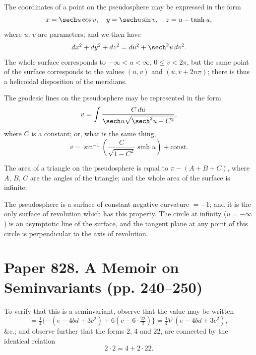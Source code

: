 \documentclass[11pt,a4paper]{book}
\begin{document}
\newpage
\begin{art}
The coordinates of a point on the pseudosphere may be expressed in the form
\[
x = \sech u \cos v, \quad y = \sech u \sin v, \quad z = u - \tanh u,
\]
where $u$, $v$ are parameters; and we then have
\[
dx^2 + dy^2 + dz^2 = du^2 + \sech^2 u \, dv^2.
\]
The whole surface corresponds to $-\infty < u < \infty$, $0 \le v < 2\pi$, but the same point of the surface corresponds to the values $(u,v)$ and $(u, v + 2n\pi)$; there is thus a helicoidal disposition of the meridians.
\end{art}

\begin{art}
The geodesic lines on the pseudosphere may be represented in the form
\[
v = \int \frac{C\,du}{\sech u \sqrt{\sech^2 u - C^2}},
\]
where $C$ is a constant; or, what is the same thing,
\[
v = \sin^{-1}\left(\frac{C}{\sqrt{1-C^2}} \sinh u\right) + \text{const}.
\]
\end{art}

\begin{art}
The area of a triangle on the pseudosphere is equal to $\pi - (A + B + C)$, where $A$, $B$, $C$ are the angles of the triangle; and the whole area of the surface is infinite.
\end{art}

\begin{art}
The pseudosphere is a surface of constant negative curvature $= -1$; and it is the only surface of revolution which has this property. The circle at infinity ($u = -\infty$) is an asymptotic line of the surface, and the tangent plane at any point of this circle is perpendicular to the axis of revolution.
\end{art}

\newpage
\section{Paper 828. A Memoir on Seminvariants (pp. 240--250)}


\begin{art}
To verify that this is a seminvariant, observe that the value may be written
\[
= \tfrac{1}{4}\{- (e - 4bd + 3c^2) + 6(c - 6\cdot\tfrac{22}{2})\} = \tfrac{1}{4}\nabla(e - 4bd + 3c^2),
\]
\&c.; and observe further that the forms $2$, $4$ and $22$, are connected by the identical relation
\[
2 \cdot 2 = 4 + 2 \cdot 22.
\]
\end{art}
\end{document}
